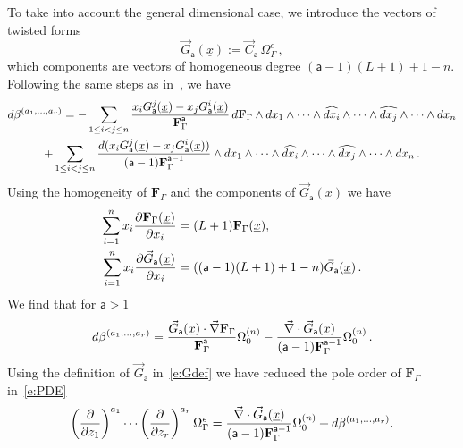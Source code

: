 \documentclass[a4paper,12pt]{article}
\numberwithin{equation}{section}
\numberwithin{figure}{section}
\begin{document}
To take into account the general dimensional case, we introduce 
the vectors of twisted forms
\begin{equation}
  \label{e:Gdef}
\vec  G_{\mathsf{a}}(\underline x):=   \vec C_{\mathsf{a}} \,\Omega_\Gamma^\epsilon \, ,
\end{equation}
which components are vectors of homogeneous degree $(\mathsf{a}-1)(L+1)+1-n$. 
Following the same steps as in~\cite{Griffiths_1969}, we have
\begin{multline}
  d\beta^{(a_1,\dots,a_r)}=-  \sum_{1\leq i<j\leq n} {x_i
    G_{\mathsf{a}}^j  (\underline x)-x_j
   G_{\mathsf{a}}^i(\underline x)\over
   \textbf{F}_\Gamma^{\mathsf{a}}}\, d \textbf{F}_\Gamma\wedge
 dx_1\wedge \cdots \wedge \widehat{dx_i}\wedge \cdots \wedge\widehat{dx_j}\wedge
 \cdots \wedge dx_n \cr
+  \sum_{1\leq i<j\leq n} {d(x_i
    G_{\mathsf{a}}^j  (\underline x)-x_j
   G_{\mathsf{a}}^i(\underline x))\over
    (\mathsf{a}-1)\textbf{F}_\Gamma^{\mathsf{a}-1}}\wedge
 dx_1\wedge \cdots \wedge \widehat{dx_i}\wedge \cdots \wedge\widehat{dx_j}\wedge
  \cdots \wedge dx_n  \, .
\end{multline}
Using the homogeneity of $\mathbf{F}_\Gamma$ and the
components of $\vec G_{\mathsf{a}}(\underline x)$ we have
\begin{align}
  \sum_{i=1}^n x_i {\partial\mathbf{F}_\Gamma (\underline x)\over \partial x_i}&=
                                                                  (L+1) \mathbf{F}_\Gamma (\underline x),\\
   \sum_{i=1}^n x_i {\partial\vec G_{\mathsf{a}}(\underline x)\over \partial x_i}&=
                                                                  ((\mathsf{a}-1)(L+1)+1-n) \vec G_{\mathsf{a}}(\underline x) \,.
\end{align}
We find that for $\mathsf{a}>1$
   \begin{equation}
     d\beta^{(a_1,\dots,a_r)}= {  \vec  G_{\mathsf{a}}
     (\underline x)
\cdot    \vec \nabla\textbf{F}_\Gamma\over
     \textbf{F}_\Gamma^{\mathsf{a}}}\Omega_0^{(n)}-{
\vec\nabla \cdot \vec G_{\mathsf{a}}
     (\underline x)
    \over
    (\mathsf{a}-1)\textbf{F}_\Gamma^{\mathsf{a}-1}}
  \Omega_0^{(n)} \,.
\end{equation}
Using the definition of $\vec  G_{\mathsf{a}}$ in~\eqref{e:Gdef} we
have reduced the pole order  of $ \textbf{F}_\Gamma$ in~\eqref{e:PDE} 
\begin{equation}\label{e:RedG1}
\left(\partial\over \partial z_1\right)^{a_1}\cdots\left(\partial
  \over\partial z_r\right)^{a_r} \Omega_\Gamma^\epsilon={
\vec\nabla \cdot \vec G_{\mathsf{a}}
     (\underline x)
    \over
    (\mathsf{a}-1)\textbf{F}_\Gamma^{\mathsf{a}-1}}
  \Omega_0^{(n)}+d\beta^{(a_1,\dots,a_r)}.
\end{equation}
\end{document}
